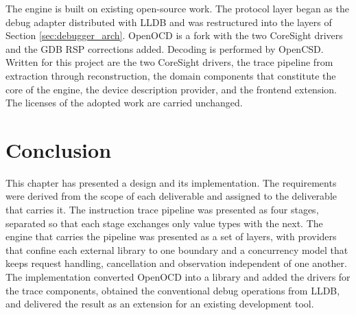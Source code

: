 The engine is built on existing open-source work. The protocol layer began as the debug adapter distributed with LLDB and was restructured into the layers of Section \ref{sec:debugger_arch}. OpenOCD is a fork with the two CoreSight drivers and the GDB RSP corrections added. Decoding is performed by OpenCSD. Written for this project are the two CoreSight drivers, the trace pipeline from extraction through reconstruction, the domain components that constitute the core of the engine, the device description provider, and the frontend extension. The licenses of the adopted work are carried unchanged.

\section*{Conclusion}
This chapter has presented a design and its implementation. The requirements were derived from the scope of each deliverable and assigned to the deliverable that carries it. The instruction trace pipeline was presented as four stages, separated so that each stage exchanges only value types with the next. The engine that carries the pipeline was presented as a set of layers, with providers that confine each external library to one boundary and a concurrency model that keeps request handling, cancellation and observation independent of one another. The implementation converted OpenOCD into a library and added the drivers for the trace components, obtained the conventional debug operations from LLDB, and delivered the result as an extension for an existing development tool.
